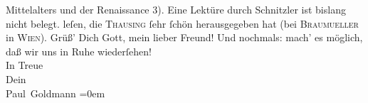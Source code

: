 \begin{ledgroupsized}[t]{13cm}
{{{                     Mittelalters und der Renaissance 3). Eine Lektüre durch Schnitzler ist bislang nicht belegt.}}}\label{K_L02627-12h}
               leſen, die \textsc{Thausing} ſehr ſchön herausgegeben hat (bei \textsc{Braumueller} in \textsc{Wien}).\pend
           \pstart
           Grüß’ Dich Gott, mein lieber Freund! Und nochmals: mach’ es möglich, daß wir uns
                  {\pb}in Ruhe wiederſehen! {\\[\baselineskip]}In Treue {\\[\baselineskip]}Dein {\\[\baselineskip]}\spacefill\mbox{Paul Goldmann}\pend
           \leftskip=0em{}
         
         \endnumbering{}\end{ledgroupsized}  \newcommand{\dateiname}{L02627}\newcommand{\titel}{Paul Goldmann an Arthur Schnitzler, 19. 6. [1894]}\newcommand{\editorInnen}{Martin Anton Müller und Laura Untner}
      